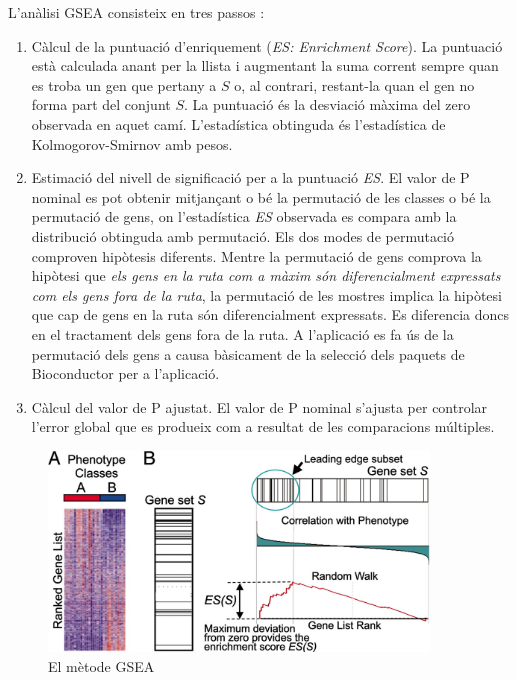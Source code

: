 L'anàlisi \gls{GSEA} consisteix en tres passos \cite{subramanian2005gene}:

\begin{enumerate}
\item Càlcul de la puntuació d'enriquement (\textit{\gls{ES}: Enrichment Score}). La puntuació està calculada anant per la llista i augmentant la suma corrent sempre quan es troba un gen que pertany a $S$ o, al contrari, restant-la quan el gen no forma part del conjunt $S$. La puntuació és la desviació màxima del zero observada en aquet camí. L'estadística obtinguda és l’estadística de Kolmogorov-Smirnov amb pesos.

\item Estimació del nivell de significació per a la puntuació \textit{\gls{ES}}. El valor de P nominal es pot obtenir mitjançant o bé la permutació de les classes o bé la permutació de gens, on l'estadística \textit{\gls{ES}} observada es compara amb la distribució obtinguda amb permutació. Els dos modes de permutació comproven hipòtesis diferents. Mentre la permutació de gens comprova la hipòtesi que \textit{els gens en la ruta com a màxim són diferencialment expressats com els gens fora de la ruta},
la permutació de les mostres implica la hipòtesi que cap de gens en la ruta són diferencialment expressats. Es diferencia doncs en el tractament dels gens fora de la ruta. A l'aplicació es fa ús de la permutació dels gens a causa bàsicament de la selecció dels paquets de \gls{Bioconductor} per a l’aplicació.


\item Càlcul del valor de P ajustat. El valor de P nominal s'ajusta per controlar l'error global que es produeix com a resultat de les comparacions múltiples.
\end{enumerate}

\begin{figure}[H]
\centering
\includegraphics[width=0.9\textwidth]{figures/GSEA_Method.jpg} 
\caption{El mètode \gls{GSEA}}
\end{figure}

